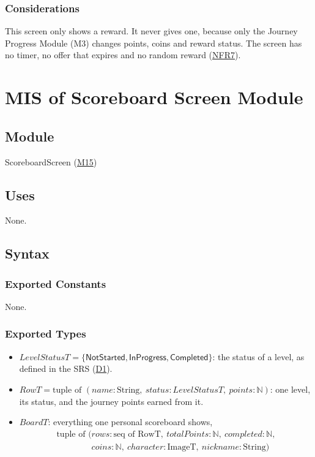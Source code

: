 \documentclass[10pt, titlepage]{article}
\newcommand{\srsurl}{https://team-hindsight.github.io/ophthamology-game/SRS/SRS.pdf}
\newcommand{\srsitemref}[2]{\href{\srsurl\#nameddest=#1}{#2}}
\newcommand{\misref}[2]{\hyperref[mis:#1]{M#2}}
\newcommand{\N}{\mathbb{N}}
\newcommand{\T}[1]{\mathit{#1}}          %
\newcommand{\V}[1]{\mathsf{#1}}          %
\begin{document}
\subsubsection{Considerations}

This screen only shows a reward. It never gives one, because only the Journey
Progress Module (M3) changes points, coins and reward status. The screen has no
timer, no offer that expires and no random reward
(\srsitemref{NFR_NoPressure}{NFR7}).

\newpage
\section{MIS of Scoreboard Screen Module} \label{mis:Scoreboard}

\subsection{Module}

ScoreboardScreen (\misref{Scoreboard}{15})

\subsection{Uses}

None.

\subsection{Syntax}

\subsubsection{Exported Constants}

None.

\subsubsection{Exported Types}

\begin{itemize}
\item $\T{LevelStatusT} = \{\V{NotStarted}, \V{InProgress}, \V{Completed}\}$:
  the status of a level, as defined in the SRS
  (\srsitemref{def_Status}{D1}).
\item $\T{RowT} = \text{tuple of } (\T{name} : \text{String},\ \T{status} :
  \T{LevelStatusT},\ \T{points} : \N)$: one level, its status, and the journey
  points earned from it.
\item $\T{BoardT}$: everything one personal scoreboard shows,
  \[\begin{array}{l}
  \text{tuple of } (\T{rows} : \text{seq of RowT},\ \T{totalPoints} : \N,\
  \T{completed} : \N,\\
  \phantom{\text{tuple of } (}\T{coins} : \N,\ \T{character} : \text{ImageT},\ \T{nickname} :
  \text{String})
  \end{array}\]
\end{itemize}
\end{document}
